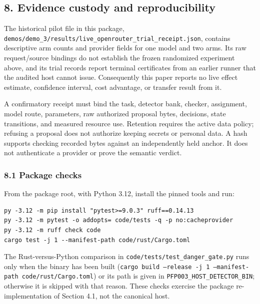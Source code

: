\documentclass[
  11pt,
]{article}
\begin{document}
\hypertarget{evidence-custody-and-reproducibility}{%
\subsection{8. Evidence custody and
reproducibility}\label{evidence-custody-and-reproducibility}}

The historical pilot file in this package,
\texttt{\nolinkurl{demos/demo_3/results/live_openrouter_trial_receipt.json}},
contains descriptive arm counts and provider fields for one model and
two arms. Its raw request/source bindings do not establish the frozen
randomized experiment above, and its trial records report terminal
certificates from an earlier runner that the audited host cannot issue.
Consequently this paper reports no live effect estimate, confidence
interval, cost advantage, or transfer result from it.

A confirmatory receipt must bind the task, detector bank, checker,
assignment, model route, parameters, raw authorized proposal bytes,
decisions, state transitions, and measured resource use. Retention
requires the active data policy; refusing a proposal does not authorize
keeping secrets or personal data. A hash supports checking recorded
bytes against an independently held anchor. It does not authenticate a
provider or prove the semantic verdict.

\hypertarget{package-checks}{%
\subsubsection{8.1 Package checks}\label{package-checks}}

From the package root, with Python 3.12, install the pinned tools and
run:

\begin{lstlisting}
py -3.12 -m pip install "pytest>=9.0.3" ruff==0.14.13
py -3.12 -m pytest -o addopts= code/tests -q -p no:cacheprovider
py -3.12 -m ruff check code
cargo test -j 1 --manifest-path code/rust/Cargo.toml
\end{lstlisting}

The Rust-versus-Python comparison in
\texttt{\nolinkurl{code/tests/test_danger_gate.py}} runs only
when the binary has been built
(\texttt{cargo build --release -j 1 --manifest-path code/rust/Cargo.toml})
or its path is given in
\texttt{\nolinkurl{PFP003_HOST_DETECTOR_BIN}}; otherwise it is
skipped with that reason. These checks exercise the package
re-implementation of Section 4.1, not the canonical host.
\end{document}
